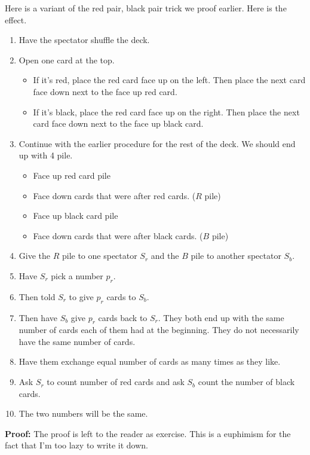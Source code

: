 \documentclass[a4paper, 12pt]{article}
\renewcommand{\proof}{\noindent\textbf{Proof:} }
\theoremstyle{examplestyle}
\begin{document}
\begin{multicols}{2}
Here is a variant of the red pair, black pair trick we proof earlier. Here is the effect.
\begin{enumerate}
	\item Have the spectator shuffle the deck.
	\item Open one card at the top. 
		\begin{itemize}
			\item If it's red, place the red card face up on the left. Then place the next card face down next to the face up red card.
			\item If it's black, place the red card face up on the right. Then place the next card face down next to the face up black card.
		\end{itemize} 
	\item Continue with the earlier procedure for the rest of the deck. We should end up with 4 pile.
		\begin{itemize}
			\item Face up red card pile
			\item Face down cards that were after red cards. ($R$ pile)
			\item Face up black card pile
			\item Face down cards that were after black cards. ($B$ pile)
		\end{itemize}
	\item Give the $R$ pile to one spectator $S_r$ and the $B$ pile to another spectator $S_b$.
	\item Have $S_r$ pick a number $p_r$.
	\item Then told $S_r$ to give $p_r$ cards to $S_b$. 
	\item Then have $S_b$ give $p_r$ cards back to $S_r$. They both end up with the same number of cards each of them had at the beginning. They do not necessarily have the same number of cards.
	\item Have them exchange equal number of cards as many times as they like.
	\item Ask $S_r$ to count number of red cards and ask $S_b$ count the number of black cards.
	\item The two numbers will be the same.
\end{enumerate}

\proof The proof is left to the reader as exercise. This is a euphimism for the fact that I'm too lazy to write it down.


\end{multicols}
\end{document}
